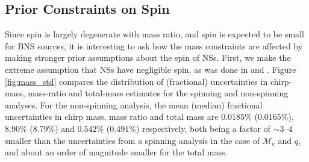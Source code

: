 \subsection{Prior Constraints on Spin}
\label{subsec:prior_constraints}

Since spin is largely degenerate with mass ratio, and spin is expected to be small for BNS sources, it is interesting to ask how the mass constraints are affected by making stronger prior assumptions about the spin of NSs.  First, we make the extreme assumption that NSs have negligible spin, as was done in \citet{Singer_2014} and \citet{Berry_2014}.  Figure \ref{fig:mass_std} compares the distribution of (fractional) uncertainties in chirp-mass, mass-ratio and total-mass estimates for the spinning and non-spinning analyses. For the non-spinning analysis, the mean (median) fractional uncertainties in chirp mass, mass ratio and total mass are $0.0185\%$ ($0.0165\%$), $8.90\%$ ($8.79\%$) and $0.542\%$ ($0.491\%$) respectively, both being a factor of $\sim3$--$4$ smaller than the uncertainties from a spinning analysis in the case of $\mathcal{M}_\mathrm{c}$ and $q$, and about an order of magnitude smaller for the total mass.
  
  
  
  
  
  
  
  
  
  
  
  
  